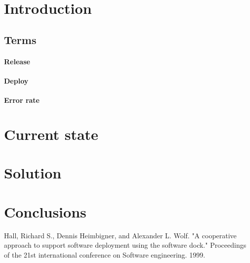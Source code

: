 \documentclass[conference]{IEEEtran}
\begin{document}
\section{Introduction}

\subsection{Terms}
\paragraph{Release}
\paragraph{Deploy}
\paragraph{Error rate}

\section{Current state}

\section{Solution}

\section{Conclusions}

\begin{thebibliography}{00}

     Hall, Richard S., Dennis Heimbigner, and Alexander L. Wolf. "A cooperative approach to support software deployment using the software dock." Proceedings of the 21st international conference on Software engineering. 1999.

\end{thebibliography}
\end{document}
